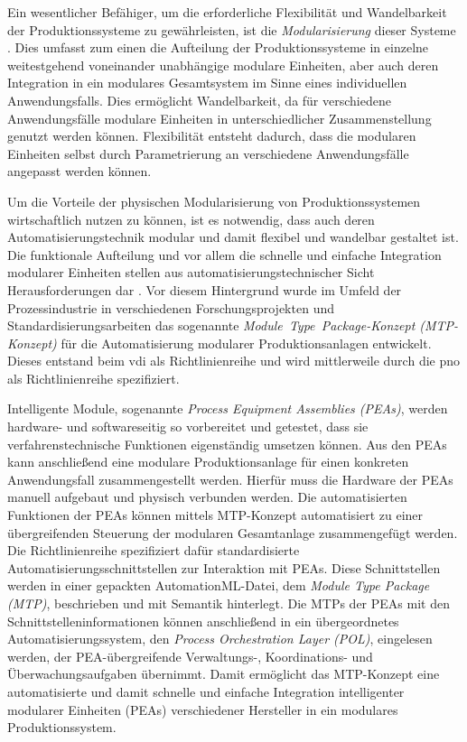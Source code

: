 Ein wesentlicher Befähiger, um die erforderliche Flexibilität und Wandelbarkeit der Produktionssysteme zu gewährleisten, ist die \emph{Modularisierung} dieser Systeme \cite{Lier.2015.DE,GroePuppendahl.2016,Seibold.2020}. Dies umfasst zum einen die Aufteilung der Produk\-tions\-systeme in einzelne weitestgehend voneinander unabhängige modulare Einheiten, aber auch deren Integration in ein modulares Gesamtsystem im Sinne eines individuellen Anwendungsfalls. Dies ermöglicht Wandelbarkeit, da für verschiedene Anwendungsfälle modulare Einheiten in unterschiedlicher Zusammenstellung genutzt werden können. Flexibilität entsteht dadurch, dass die modularen Einheiten selbst durch Parametrierung an verschiedene Anwendungsfälle angepasst werden können.

Um die Vorteile der physischen Modularisierung von Produktionssystemen wirtschaftlich nutzen zu können, ist es notwendig, dass auch deren Automatisierungstechnik modular und damit flexibel und wandelbar gestaltet ist. Die funktionale Aufteilung und vor allem die schnelle und einfache Integration modularer Einheiten stellen aus automatisierungstechnischer Sicht Herausforderungen dar \cite{Urbas.2012}. Vor diesem Hintergrund wurde im Umfeld der Prozessindustrie in verschiedenen Forschungsprojekten \cite{DECHEMA.,CORDIS.2021} und Standardisierungsarbeiten \cite{PNO.2025,VDIVDEGMA.DE,VDI.2020} das sogenannte \emph{Module~Type~Pa\-cka\-ge-Konzept (MTP-Konzept)} für die Automatisierung modularer Produktionsanlagen entwickelt. Dieses entstand beim \gls{vdi} als Richtlinienreihe \cite{VDIVDEGMA.DE} und wird mittlerweile durch die \gls{pno} als Richtlinienreihe \cite{PNO.2025} spezifiziert. 

Intelligente Module, sogenannte \emph{Process Equipment Assemblies (PEAs)}, werden hardware- und softwareseitig so vorbereitet und getestet, dass sie verfahrenstechnische Funktionen eigenständig umsetzen können. Aus den PEAs kann anschließend eine modulare Produktionsanlage für einen konkreten Anwendungsfall zusammengestellt werden. Hierfür muss die Hardware der PEAs manuell aufgebaut und physisch verbunden werden. Die automatisierten Funktionen der PEAs können mittels MTP-Konzept automatisiert zu einer übergreifenden Steuerung der modularen Gesamtanlage zusammengefügt werden. Die Richtlinienreihe \cite{PNO.2025} spezifiziert dafür standardisierte Automatisierungsschnittstellen zur Interaktion mit PEAs. Diese Schnittstellen werden in einer gepackten AutomationML-Datei, dem \emph{Module Type Package (MTP)}, beschrieben und mit Semantik hinterlegt. Die MTPs der PEAs mit den Schnittstelleninformationen können anschließend in ein übergeordnetes Automatisierungssystem, den \emph{Process Orchestration Layer (POL)}, eingelesen werden, der PEA-übergreifende Verwaltungs-, Koordinations- und Überwachungsaufgaben übernimmt. Damit ermöglicht das MTP-Konzept eine automatisierte und damit schnelle und einfache Integration intelligenter modularer Einheiten (PEAs) verschiedener Hersteller in ein modulares Produktionssystem.

